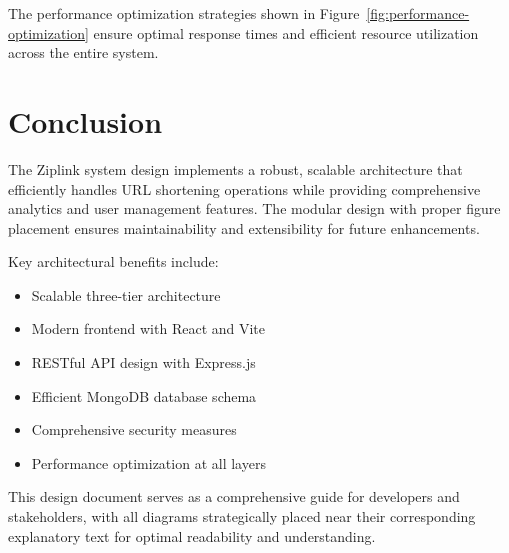 \documentclass[11pt,a4paper]{article}
\begin{document}
The performance optimization strategies shown in Figure~\ref{fig:performance-optimization} ensure optimal response times and efficient resource utilization across the entire system.

\section{Conclusion}

The Ziplink system design implements a robust, scalable architecture that efficiently handles URL shortening operations while providing comprehensive analytics and user management features. The modular design with proper figure placement ensures maintainability and extensibility for future enhancements.

Key architectural benefits include:
\begin{itemize}
    \item Scalable three-tier architecture
    \item Modern frontend with React and Vite
    \item RESTful API design with Express.js
    \item Efficient MongoDB database schema
    \item Comprehensive security measures
    \item Performance optimization at all layers
\end{itemize}

This design document serves as a comprehensive guide for developers and stakeholders, with all diagrams strategically placed near their corresponding explanatory text for optimal readability and understanding.
\end{document}
